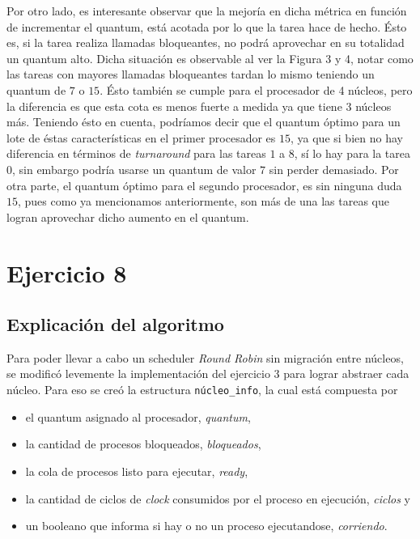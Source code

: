 \documentclass[a4paper]{article}
\begin{document}
Por otro lado, es interesante observar que la mejoría en dicha métrica en
función de incrementar el quantum, está acotada por lo que la tarea hace de
hecho. Ésto es, si la tarea realiza llamadas bloqueantes, no podrá
aprovechar en su totalidad un quantum alto. Dicha situación es observable al
ver la Figura 3 y 4, notar como las tareas con mayores llamadas bloqueantes
tardan lo mismo teniendo un quantum de $7$ o $15$. Ésto también se cumple
para el procesador de 4 núcleos, pero la diferencia es que esta cota es
menos fuerte a medida ya que tiene 3 núcleos más.
Teniendo ésto en cuenta, podríamos decir que el quantum óptimo para un
lote de éstas características en el primer procesador es $15$, ya que si bien 
no hay diferencia en términos de \textit{turnaround} para las tareas
$1$ a $8$, sí lo hay para la tarea $0$, sin embargo podría usarse un quantum de valor
$7$ sin perder demasiado.
Por otra parte, el quantum óptimo para el segundo procesador, es sin ninguna
duda $15$, pues como ya mencionamos anteriormente, son más de una las tareas
que logran aprovechar dicho aumento en el quantum.

\newpage

\section{Ejercicio 8}

\subsection{Explicación del algoritmo}
Para poder llevar a cabo un scheduler \textit{Round Robin} sin migración
entre núcleos, se modificó levemente la implementación del ejercicio 3 para
lograr abstraer cada núcleo. Para eso se creó la estructura
\verb|núcleo_info|, la cual está compuesta por

\begin{itemize}
  \item el quantum asignado al procesador, \textit{quantum},
  \item la cantidad de procesos bloqueados, \textit{bloqueados},
  \item la cola de procesos listo para ejecutar, \textit{ready},
  \item la cantidad de ciclos de \textit{clock} consumidos por el proceso en
  ejecución, \textit{ciclos} y
  \item un booleano que informa si hay o no un proceso ejecutandose,
  \textit{corriendo}.
\end{itemize}
\end{document}

